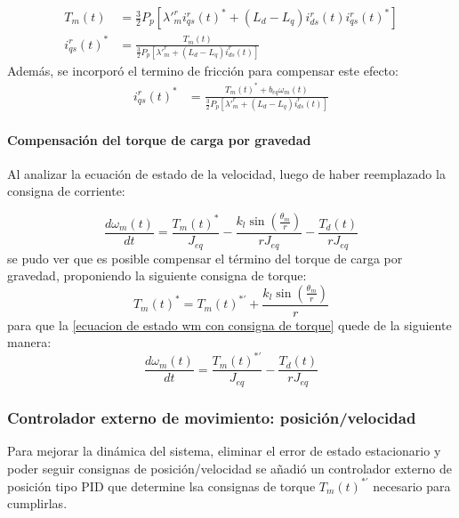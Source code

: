 \documentclass[a4paper, 10pt, onecolumn,journal]{ieeeconf}
\begin{document}
\begin{align}
	T_m(t) &= \frac{3}{2} P_p [\lambda'^r_{m} {i^r_{qs}(t)}^* + (L_d - L_q) i^r_{ds}(t) {i^r_{qs}(t)}^*] \label{torque electromagnetico 2}\\
	{i^r_{qs}(t)}^* &= \frac{T_m(t)}{\frac{3}{2} P_p [\lambda'^r_{m} + (L_d - L_q) i^r_{ds}(t)]}
\end{align}
 Además, se incorporó el termino de fricción para compensar este efecto:
 \begin{align}
 	{i^r_{qs}(t)}^* &= \frac{{T_m(t)}^* + b_{eq} \omega_m(t) }{\frac{3}{2} P_p [\lambda'^r_{m} + (L_d - L_q) i^r_{ds}(t)]}
 \end{align}
	
\paragraph{\textbf{Compensación del torque de carga por gravedad}}
Al analizar la ecuación de estado de la velocidad, luego de haber reemplazado la consigna de corriente:

\begin{equation}
	\frac{d \omega_m(t)}{dt} = \frac{{T_m(t)}^*}{ J_{eq}} - \frac{k_l \sin \left( \frac{\theta_m}{r}\right) }{r J_{eq}} - \frac{T_d(t)}{r J_{eq}}
	\label{ecuacion de estado wm con consigna de torque}
\end{equation}
se pudo ver que es posible compensar el término del torque de carga por gravedad, proponiendo la siguiente consigna de torque:
\begin{equation}
	{T_m(t)}^* = {T_m(t)}^{*'} + \frac{k_l \sin \left( \frac{\theta_m}{r}\right) }{r}
	\label{consigna de torque para desacoplar carga por gravedad}
\end{equation}
para que la \cref{ecuacion de estado wm con consigna de torque} quede de la siguiente manera:
\begin{equation}
	\frac{d \omega_m(t)}{dt} = \frac{{T_m(t)}^{*'}}{ J_{eq}}- \frac{T_d(t)}{r J_{eq}}
	\label{ecuacion de estado wm sin gravedad}
\end{equation}

\subsubsection{\textbf{Controlador externo de movimiento: posición/velocidad}}
Para mejorar la dinámica del sistema, eliminar el error de estado estacionario y poder seguir consignas de posición/velocidad se añadió un controlador externo de posición tipo PID que determine lsa consignas de torque $T_m(t)^{*'}$ necesario para cumplirlas.
\end{document}
